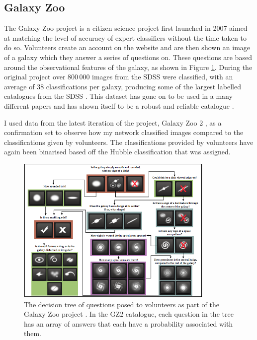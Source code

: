 \documentclass[12pt, onecolumn]{aa}
\begin{document}
\subsection{Galaxy Zoo}\label{sec:GZdata}
The Galaxy Zoo project is a citizen science project first launched in 2007 \citep{Lintott2008} aimed at matching the level of accuracy of expert classifiers without the time taken to do so. Volunteers create an account on the website and are then shown an image of a galaxy which they answer a series of questions on. These questions are based around the observational features of the galaxy, as shown in Figure \ref{fig:GZ_decision}. During the original project over 800\,000 images from the SDSS were classified, with an average of 38 classifications per galaxy, producing some of the largest labelled catalogues from the SDSS \citep{2011MNRAS.410..166L}. This dataset has gone on to be used in a many different papers and has shown itself to be a robust and reliable catalogue \citep{greenpeasgz, unwindinggz, barsgz, barsenvgz}.


I used data from the latest iteration of the project, Galaxy Zoo 2 \citep{Willett2013}, as a confirmation set to observe how my network classified images compared to the classifications given by volunteers. The classifications provided by volunteers have again been binarised based off the Hubble classification that was assigned. 
\begin{figure}
    \centering
    \includegraphics[width= 0.85\textwidth]{Figures/GZ_Decison_Tree.png}
    \caption{The decision tree of questions posed to volunteers as part of the Galaxy Zoo project \citep{Willett2013}. In the GZ2 catalogue, each question in the tree has an array of answers that each have a probability associated with them.}
    \label{fig:GZ_decision}
\end{figure}
\end{document}
